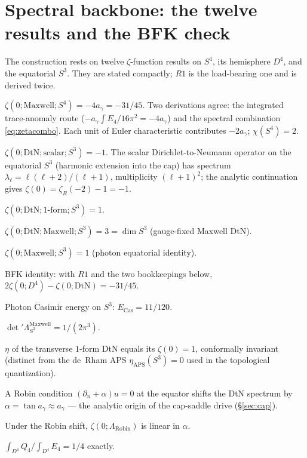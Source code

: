 \documentclass[11pt,a4paper]{article}
\theoremstyle{definition}
\theoremstyle{remark}
\newcommand{\ag}{a_\gamma}
\begin{document}
\section{Spectral backbone: the twelve results and the BFK check}\label{sec:spectral}
The construction rests on twelve $\zeta$-function results on $S^4$, its hemisphere $D^4$, and the
equatorial $S^3$. They are stated compactly; $R1$ is the load-bearing one and is derived twice.

\begin{description}[leftmargin=2.6em,nosep,itemsep=2pt]
\item[R1.] $\zeta(0;\mathrm{Maxwell};S^4)=-4\ag=-31/45$. Two derivations agree: the integrated
trace-anomaly route ($-\ag\int E_4/16\pi^2=-4\ag$) and the spectral combination
\eqref{eq:zetacombo}. Each unit of Euler characteristic contributes $-2\ag$; $\chi(S^4)=2$.
\item[R2.] $\zeta(0;\mathrm{DtN};\mathrm{scalar};S^3)=-1$. The scalar Dirichlet-to-Neumann operator
on the equatorial $S^3$ (harmonic extension into the cap) has spectrum
$\lambda_\ell=\ell(\ell+2)/(\ell+1)$, multiplicity $(\ell+1)^2$; the analytic continuation gives
$\zeta(0)=\zeta_R(-2)-1=-1$.
\item[R3.] $\zeta(0;\mathrm{DtN};\text{1-form};S^3)=1$.
\item[R4.] $\zeta(0;\mathrm{DtN};\mathrm{Maxwell};S^3)=3=\dim S^3$ (gauge-fixed Maxwell DtN).
\item[R5.] $\zeta(0;\mathrm{Maxwell};S^3)=1$ (photon equatorial identity).
\item[R6.] BFK identity: with $R1$ and the two bookkeepings below,
$2\zeta(0;D^4)-\zeta(0;\mathrm{DtN})=-31/45$.
\item[R7.] Photon Casimir energy on $S^3$: $E_{\mathrm{Cas}}=11/120$.
\item[R8.] $\det{}'\Lambda^{\mathrm{Maxwell}}_{S^3}=1/(2\pi^3)$.
\item[R9.] $\eta$ of the transverse $1$-form DtN equals its $\zeta(0)=1$, conformally invariant
(distinct from the de~Rham APS $\eta_{\mathrm{APS}}(S^3)=0$ used in the topological quantization).
\item[R10.] A Robin condition $(\partial_n+\alpha)u=0$ at the equator shifts the DtN spectrum by
$\alpha=\tan\ag\approx\ag$ --- the analytic origin of the cap-saddle drive (\S\ref{sec:cap}).
\item[R11.] Under the Robin shift, $\zeta(0;\Lambda_{\mathrm{Robin}})$ is linear in $\alpha$.
\item[R12.] $\int_{D^4}Q_4/\int_{D^4}E_4=1/4$ exactly.
\end{description}
\end{document}
